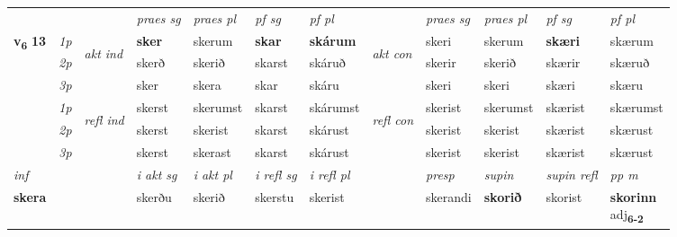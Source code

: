 \begin{longtable}[l]{X>{\footnotesize\itshape}llXXXXlXXXX}
 & &   & \textit{praes sg}  & \textit{praes pl}    & \textit{ pf sg} & \textit{pf pl} & & \textit{praes sg}  & \textit{praes pl}    & \textit{pf sg} & \textit{pf pl }  \\ \cmidrule{4-7} \cmidrule{9-12}
 \multirow{2}{*}{{{\textbf{v{\textsubscript{6}}} \Large{\textbf{13}}}}}  & 1p & \multirow{3}{*}{\begin{turn}{90}\textit{akt ind}\end{turn}} & \textbf{sker} & skerum & \textbf{skar} & \textbf{skárum} & \multirow{3}{*}{\begin{turn}{90}\textit{akt con}\end{turn}} &skeri & skerum & \textbf{skæri} & skærum\\*
 & 2p &  &  skerð  & skerið & skarst & skáruð & & skerir & skerið & skærir & skæruð \\*
 & 3p &  & sker & skera & skar & skáru & & skeri & skeri& skæri & skæru \\*
\cmidrule{4-7} \cmidrule{9-12}
 & 1p & \multirow{3}{*}{\begin{turn}{90}\textit{refl ind}\end{turn}}  & skerst & skerumst & skarst & skárumst & \multirow{3}{*}{\begin{turn}{90}\textit{refl con}\end{turn}}  &skerist & skerumst & skærist & skærumst \\*
 & 2p &  & skerst & skerist & skarst & skárust & &skerist & skerist & skærist & skærust \\*
 & 3p  & & skerst & skerast & skarst & skárust & & skerist & skerist& skærist & skærust \\*
\cmidrule{4-7} \cmidrule{9-12}

   {\textit{inf}} & &  & \textit{i akt sg} & \textit{i akt pl} & \textit{i refl sg} & \textit{i refl pl} && \textit{presp} & \textit{supin} & \textit{supin refl} & \textit{pp m} \\*
  {\textbf{skera}} & && skerðu  & skerið & skerstu & skerist && skerandi &  \textbf{skorið} & skorist & \specialcell{\textbf{skorinn} \\ adj\textbf{\textsubscript{6-2}}} \\*

\midrule


\end{longtable}
